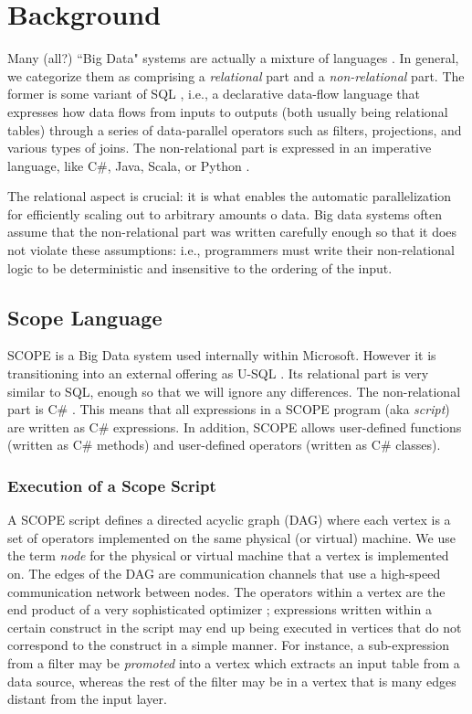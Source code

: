 \section{Background}
Many (all?) ``Big Data" systems are actually a mixture of languages \cite{}.
In general, we categorize them as comprising a {\it relational} part and a {\it non-relational} part.
The former is some variant of SQL \cite{}, i.e., a declarative data-flow language that expresses how data flows
from inputs to outputs (both usually being relational tables) through a series of data-parallel operators
such as filters, projections, and various types of joins.
The non-relational part is expressed in an imperative language, like C\#, Java, Scala, or Python \cite{}.

The relational aspect is crucial: it is what enables the automatic parallelization for efficiently scaling out to
arbitrary amounts o data.
Big data systems often assume that the non-relational part was written carefully enough so that it does not
violate these assumptions: i.e., programmers must write their non-relational logic to be deterministic and insensitive
to the ordering of the input.

\subsection{Scope Language}
SCOPE \cite{} is a Big Data system used internally within Microsoft.
However it is transitioning into an external offering as U-SQL \cite{}.
Its relational part is very similar to SQL, enough so that we will ignore any differences.
The non-relational part is C\# \cite{}.
This means that all expressions in a SCOPE program (aka {\it script}) are written as C# expressions.
In addition, SCOPE allows user-defined functions (written as C\# methods) and user-defined operators
(written as C\# classes).

\subsubsection{Execution of a Scope Script}
A SCOPE script defines a directed acyclic graph (DAG) where each vertex is a set of operators implemented on the
same physical (or virtual) machine. We use the term {\it node} for the physical or virtual machine that a
vertex is implemented on.
The edges of the DAG are communication channels that use a high-speed communication network between nodes.
The operators within a vertex are the end product of a very sophisticated optimizer \cite{}; expressions written
within a certain construct in the script may end up being executed in vertices that do not correspond to the
construct in a simple manner.
For instance, a sub-expression from a filter may be {\it promoted} into a vertex which extracts an input
table from a data source, whereas the rest of the filter may be in a vertex that is many edges distant from
the input layer.

